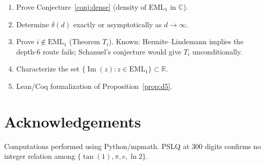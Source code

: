 \documentclass[12pt]{article}
\begin{document}
\begin{enumerate}
\item Prove Conjecture~\ref{conj:dense} (density of $\mathrm{EML}_1$ in $\mathbb{C}$).
\item Determine $\delta(d)$ exactly or asymptotically as $d \to \infty$.
\item Prove $i \notin \mathrm{EML}_1$ (Theorem $T_i$). Known: Hermite--Lindemann
      implies the depth-6 route fails; Schanuel's conjecture would give $T_i$
      unconditionally.
\item Characterize the set $\{\operatorname{Im}(z) : z \in \mathrm{EML}_1\} \subset \mathbb{R}$.
\item Lean/Coq formalization of Proposition~\ref{prop:d5}.
\end{enumerate}

\section*{Acknowledgements}
Computations performed using Python/mpmath. PSLQ at 300 digits confirms no integer
relation among $\{\tan(1), \pi, e, \ln 2\}$.
\end{document}
